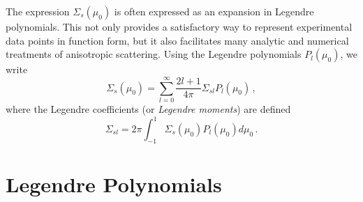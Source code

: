 The expression $\Sigma_s(\mu_0)$ is often expressed as an expansion in Legendre 
polynomials.  This not only provides a satisfactory way to represent 
experimental data points in function form, but it also facilitates many analytic 
and numerical treatments of anisotropic scattering.  Using the Legendre 
polynomials $P_l(\mu_0)$, we write
\begin{equation}
 \Sigma_s(\mu_0) = \sum^{\infty}_{l=0} \frac{2l+1}{4\pi} \Sigma_{sl}P_{l}(\mu_0) 
\, , 
 \label{eq:scatterkernel}
\end{equation}
where the Legendre coefficients (or \textit{Legendre moments}) are defined
\begin{equation}
 \Sigma_{sl} = 2\pi \int^{1}_{-1} \Sigma_s(\mu_0) P_l(\mu_0) d\mu_0 \, .
 \label{eq:scattermoment}
\end{equation}

\section*{Legendre Polynomials}


